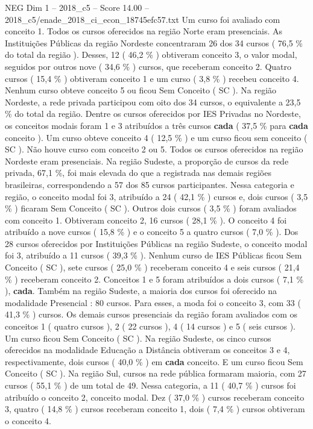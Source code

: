 \begin{textsample}{NEG Dim 1 – 2018\_c5 – Score 14.00 – 2018\_c5/enade\_2018\_ci\_econ\_18745efc57.txt}
Um curso foi avaliado com conceito 1.
Todos os cursos oferecidos na região Norte eram presenciais.
As Instituições Públicas da região Nordeste concentraram 26 dos 34 cursos ( 76,5 \% do total da região ).
Desses, 12 ( 46,2 \% ) obtiveram conceito 3, o valor modal, seguidos por outros nove ( 34,6 \% ) cursos, que receberam conceito 2.
Quatro cursos ( 15,4 \% ) obtiveram conceito 1 e um curso ( 3,8 \% ) recebeu conceito 4.
Nenhum curso obteve conceito 5 ou ficou Sem Conceito ( SC ).
Na região Nordeste, a rede privada participou com oito dos 34 cursos, o equivalente a 23,5 \% do total da região.
Dentre os cursos oferecidos por IES Privadas no Nordeste, os conceitos modais foram 1 e 3 atribuídos a três cursos \textbf{cada} ( 37,5 \% para \textbf{cada} conceito ).
Um curso obteve conceito 4 ( 12,5 \% ) e um curso ficou sem conceito ( SC ).
Não houve curso com conceito 2 ou 5.
Todos os cursos oferecidos na região Nordeste eram presenciais.
Na região Sudeste, a proporção de cursos da rede privada, 67,1 \%, foi mais elevada do que a registrada nas demais regiões brasileiras, correspondendo a 57 dos 85 cursos participantes.
Nessa categoria e região, o conceito modal foi 3, atribuído a 24 ( 42,1 \% ) cursos e, dois cursos ( 3,5 \% ) ficaram Sem Conceito ( SC ).
Outros dois cursos ( 3,5 \% ) foram avaliados com conceito 1.
Obtiveram conceito 2, 16 cursos ( 28,1 \% ).
O conceito 4 foi atribuído a nove cursos ( 15,8 \% ) e o conceito 5 a quatro cursos ( 7,0 \% ).
Dos 28 cursos oferecidos por Instituições Públicas na região Sudeste, o conceito modal foi 3, atribuído a 11 cursos ( 39,3 \% ).
Nenhum curso de IES Públicas ficou Sem Conceito ( SC ), sete cursos ( 25,0 \% ) receberam conceito 4 e seis cursos ( 21,4 \% ) receberam conceito 2.
Conceitos 1 e 5 foram atribuídos a dois cursos ( 7,1 \% ), \textbf{cada}.
Também na região Sudeste, a maioria dos cursos foi oferecido na modalidade Presencial : 80 cursos.
Para esses, a moda foi o conceito 3, com 33 ( 41,3 \% ) cursos.
Os demais cursos presenciais da região foram avaliados com os conceitos 1 ( quatro cursos ), 2 ( 22 cursos ), 4 ( 14 cursos ) e 5 ( seis cursos ).
Um curso ficou Sem Conceito ( SC ).
Na região Sudeste, os cinco cursos oferecidos na modalidade Educação a Distância obtiveram os conceitos 3 e 4, respectivamente, dois cursos ( 40,0 \% ) em \textbf{cada} conceito.
E um curso ficou Sem Conceito ( SC ).
Na região Sul, cursos na rede pública formaram maioria, com 27 cursos ( 55,1 \% ) de um total de 49.
Nessa categoria, a 11 ( 40,7 \% ) cursos foi atribuído o conceito 2, conceito modal.
Dez ( 37,0 \% ) cursos receberam conceito 3, quatro ( 14,8 \% ) cursos receberam conceito 1, dois ( 7,4 \% ) cursos obtiveram o conceito 4.

\end{textsample}
